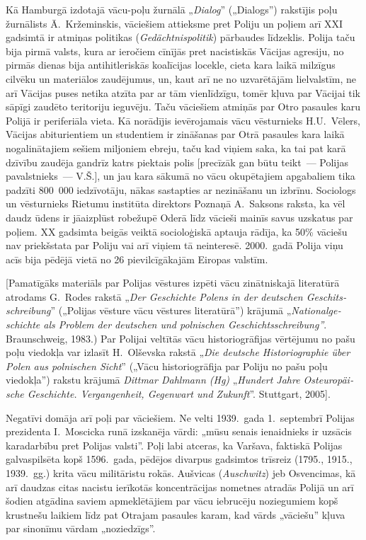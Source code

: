 \documentclass[twoside,a5paper,12pt,fleqn,openany]{extbook}
\newcommand{\detxti}[1]{\textit{\textgerman{#1}}}
\begin{document}
Kā Hamburgā izdotajā vācu-poļu žurnālā „\detxti{Dialog}” („Dialogs”) rakstījis poļu žurnālists Ā.~Kržeminskis, vāciešiem attieksme pret Poliju un poļiem arī XXI gadsimtā ir atmiņas politikas (\detxti{Gedächtnispolitik}) pārbaudes līdzeklis. Polija taču bija pirmā valsts, kura ar ieročiem cīnījās pret nacistiskās Vācijas agresiju, no pirmās dienas bija antihitleriskās koalīcijas locekle, cieta kara laikā milzīgus cilvēku un materiālos zaudējumus, un, kaut arī ne no uzvarētājām lielvalstīm, ne arī Vācijas puses netika atzīta par ar tām vienlīdzīgu, tomēr kļuva par Vācijai tik sāpīgi zaudēto teritoriju ieguvēju. Taču vāciešiem atmiņās par Otro pasaules karu Polijā ir periferiāla vieta. Kā norādījis ievērojamais vācu vēsturnieks H.U.~Vēlers, Vācijas abiturientiem un studentiem ir zināšanas par Otrā pasaules kara laikā nogalinātajiem sešiem miljoniem ebreju, taču kad viņiem saka, ka tai pat karā dzīvību zaudēja gandrīz katrs piektais polis [precīzāk gan būtu teikt~--- Polijas pavalstnieks~--- V.Š.], un jau kara sākumā no vācu okupētajiem apgabaliem tika padzīti 800~000 iedzīvotāju, nākas sastapties ar nezināšanu un izbrīnu. Sociologs un vēsturnieks Rietumu institūta direktors Poznaņā A.~Saksons raksta, ka vēl daudz ūdens ir jāaizplūst robežupē Oderā līdz vācieši mainīs savus uzskatus par poļiem. XX gadsimta beigās veiktā socioloģiskā aptauja rādīja, ka 50\% vāciešu nav priekšstata par Poliju vai arī viņiem tā neinteresē. 2000.~gadā Polija viņu acīs bija pēdējā vietā no 26 pievilcīgākajām Eiropas valstīm.

[Pamatīgāks materiāls par Polijas vēstures izpēti vācu zinātniskajā literatūrā atrodams G.~Rodes rakstā „\detxti{Der Geschichte Polens in der deutschen Geschitsschreibung}” („Polijas vēsture vācu vēstures literatūrā'') krājumā „\detxti{Nationalgeschichte als Problem der deutschen und polnischen Geschichtsschreibung”}. Braunschweig, 1983.) Par Polijai veltītās vācu historiogrāfijas vērtējumu no pašu poļu viedokļa var izlasīt H.~Olševska rakstā „\detxti{Die deutsche Historiographie über Polen aus polnischen Sicht}” („Vācu historiogrāfija par Poliju no pašu poļu viedokļa”) rakstu krājumā \detxti{Dittmar Dahlmann (Hg)} „\detxti{Hundert Jahre Osteuropäische Geschichte. Vergangenheit, Gegenwart und Zukunft}''. Stuttgart, 2005].

Negatīvi domāja arī poļi par vāciešiem. Ne velti 1939.~gada 1.~septembrī Polijas prezidenta I.~Moscicka runā izskanēja vārdi: „mūsu senais ienaidnieks ir uzsācis karadarbību pret Polijas valsti”. Poļi labi atceras, ka Varšava, faktiskā Polijas galvaspilsēta kopš 1596.~gada, pēdējos divarpus gadsimtos trīsreiz (1795., 1915., 1939.~gg.) krita vācu militāristu rokās. Aušvicas (\detxti{Auschwitz}) jeb Osvencimas, kā arī daudzas citas nacistu ierīkotās koncentrācijas nometnes atradās Polijā un arī šodien atgādina saviem apmeklētājiem par vācu iebrucēju noziegumiem kopš krustnešu laikiem līdz pat Otrajam pasaules karam, kad vārds „vāciešu” kļuva par sinonīmu vārdam „noziedzīgs”.
\end{document}
